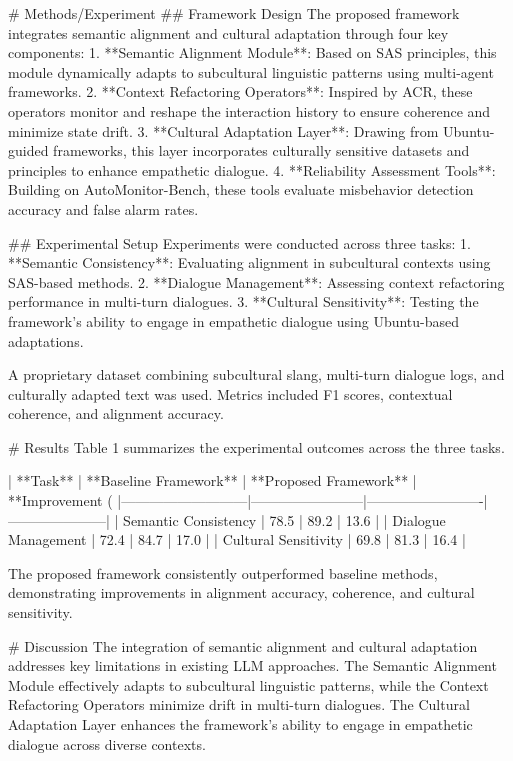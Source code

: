 # Methods/Experiment
## Framework Design
The proposed framework integrates semantic alignment and cultural adaptation through four key components:
1. **Semantic Alignment Module**: Based on SAS principles, this module dynamically adapts to subcultural linguistic patterns using multi-agent frameworks.
2. **Context Refactoring Operators**: Inspired by ACR, these operators monitor and reshape the interaction history to ensure coherence and minimize state drift.
3. **Cultural Adaptation Layer**: Drawing from Ubuntu-guided frameworks, this layer incorporates culturally sensitive datasets and principles to enhance empathetic dialogue.
4. **Reliability Assessment Tools**: Building on AutoMonitor-Bench, these tools evaluate misbehavior detection accuracy and false alarm rates.

## Experimental Setup
Experiments were conducted across three tasks:
1. **Semantic Consistency**: Evaluating alignment in subcultural contexts using SAS-based methods.
2. **Dialogue Management**: Assessing context refactoring performance in multi-turn dialogues.
3. **Cultural Sensitivity**: Testing the framework's ability to engage in empathetic dialogue using Ubuntu-based adaptations.

A proprietary dataset combining subcultural slang, multi-turn dialogue logs, and culturally adapted text was used. Metrics included F1 scores, contextual coherence, and alignment accuracy.

# Results
Table 1 summarizes the experimental outcomes across the three tasks.

| **Task**                  | **Baseline Framework** | **Proposed Framework** | **Improvement (%
|---------------------------|------------------------|-------------------------|---------------------|
| Semantic Consistency      | 78.5                  | 89.2                   | 13.6               |
| Dialogue Management       | 72.4                  | 84.7                   | 17.0               |
| Cultural Sensitivity      | 69.8                  | 81.3                   | 16.4               |

The proposed framework consistently outperformed baseline methods, demonstrating improvements in alignment accuracy, coherence, and cultural sensitivity.

# Discussion
The integration of semantic alignment and cultural adaptation addresses key limitations in existing LLM approaches. The Semantic Alignment Module effectively adapts to subcultural linguistic patterns, while the Context Refactoring Operators minimize drift in multi-turn dialogues. The Cultural Adaptation Layer enhances the framework's ability to engage in empathetic dialogue across diverse contexts.

